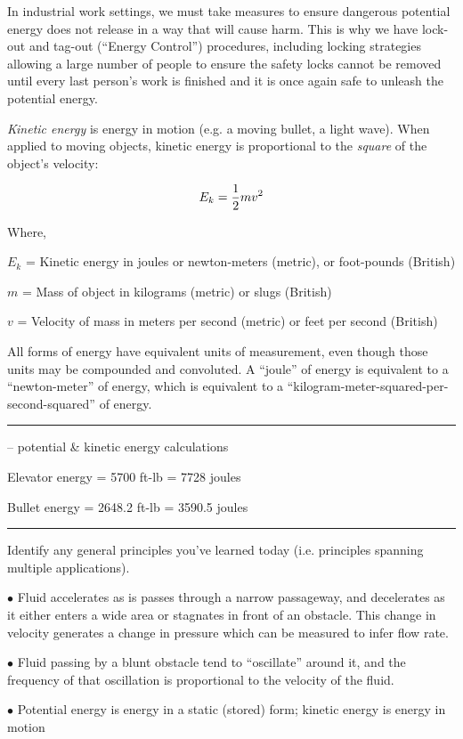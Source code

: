 In industrial work settings, we must take measures to ensure dangerous potential energy does not release in a way that will cause harm.  This is why we have lock-out and tag-out (``Energy Control'') procedures, including locking strategies allowing a large number of people to ensure the safety locks cannot be removed until every last person's work is finished and it is once again safe to unleash the potential energy.

\vskip 10pt

{\it Kinetic energy} is energy in motion (e.g. a moving bullet, a light wave).  When applied to moving objects, kinetic energy is proportional to the {\it square} of the object's velocity:

$$E_k = {1 \over 2} mv^2$$

\noindent
Where,

$E_k$ = Kinetic energy in joules or newton-meters (metric), or foot-pounds (British)

$m$ = Mass of object in kilograms (metric) or slugs (British)

$v$ = Velocity of mass in meters per second (metric) or feet per second (British)

\vskip 10pt

All forms of energy have equivalent units of measurement, even though those units may be compounded and convoluted.  A ``joule'' of energy is equivalent to a ``newton-meter'' of energy, which is equivalent to a ``kilogram-meter-squared-per-second-squared'' of energy.


\filbreak \vskip 5pt \hrule \vskip 5pt  -- potential \& kinetic energy calculations \vskip 10pt

Elevator energy = 5700 ft-lb = 7728 joules

\vskip 10pt

Bullet energy = 2648.2 ft-lb = 3590.5 joules


\filbreak \vskip 5pt \hrule \vskip 5pt  \vskip 10pt

\noindent
Identify any general principles you've learned today (i.e. principles spanning multiple applications).
\item{$\bullet$} Fluid accelerates as is passes through a narrow passageway, and decelerates as it either enters a wide area or stagnates in front of an obstacle.  This change in velocity generates a change in pressure which can be measured to infer flow rate.
\item{$\bullet$} Fluid passing by a blunt obstacle tend to ``oscillate'' around it, and the frequency of that oscillation is proportional to the velocity of the fluid.
\item{$\bullet$} Potential energy is energy in a static (stored) form; kinetic energy is energy in motion
\medskip

